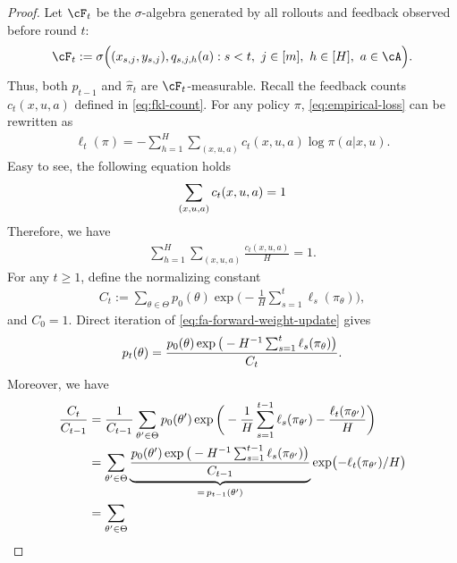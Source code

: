 \documentclass[11pt]{article}
\begin{document}
\begin{proof}
Let $\cF_t$ be the $\sigma$-algebra generated by all rollouts and
feedback observed before round $t$:
\begin{align*}
    \cF_t
    :=
    \sigma\Big(
        (x_{s,j},y_{s,j}),q_{s,j,h}(a):
        s<t,\ j\in[m],\ h\in[H],\ a\in\cA
    \Big).
\end{align*}
Thus, both $p_{t-1}$ and $\hat\pi_t$ are $\cF_t$-measurable. Recall the feedback counts
$c_t(x,u,a)$ defined in \eqref{eq:fkl-count}. For any policy $\pi$, \eqref{eq:empirical-loss} can be rewritten as
\begin{align}
    \ell_t(\pi)
    =
    -\sum_{h=1}^H
    \sum_{(x,u,a)}
    c_t(x,u,a)\log\pi(a|x,u).
    \label{eq:fa-proof-token-loss}
\end{align}
Easy to see, the following equation holds
\begin{align}
\notag
    \sum_{(x,u,a)}c_t(x,u,a)=1
\end{align}
Therefore, we have
\begin{align}  \sum_{h=1}^H\sum_{(x,u,a)}\frac{c_t(x,u,a)}{H}=1.
    \label{eq:fa-proof-feedback-mass}
\end{align}
For any $t\ge 1$, define the normalizing constant
\begin{align*}
     C_t
    :=
    \sum_{\theta\in\Theta}
    p_0(\theta)
    \exp\bigg(
        -\frac1H\sum_{s=1}^t\ell_s(\pi_\theta)
    \bigg),
\end{align*}
and $C_0 =1$. Direct iteration of \eqref{eq:fa-forward-weight-update} gives
\begin{align}
\notag
    p_t(\theta)
    =
    \frac{
        p_0(\theta)
        \exp\big(
            -H^{-1}\sum_{s=1}^t\ell_s(\pi_\theta)
        \big)
    }{
         C_t
    }.
\end{align}
Moreover, we have
\begin{align}
\notag
    \frac{C_t}{C_{t-1}}
    &=
    \frac1{C_{t-1}}
    \sum_{\theta'\in\Theta}
    p_0(\theta')
    \exp\bigg(
        -\frac1H\sum_{s=1}^{t-1}\ell_s(\pi_{\theta'})
        -
        \frac{\ell_t(\pi_{\theta'})}{H}
    \bigg)\\\notag
    &=
    \sum_{\theta'\in\Theta}
    \underbrace{
        \frac{
            p_0(\theta')
            \exp\big(
                -H^{-1}\sum_{s=1}^{t-1}\ell_s(\pi_{\theta'})
            \big)
        }{C_{t-1}}
    }_{=\,p_{t-1}(\theta')}
    \exp\bigl(-\ell_t(\pi_{\theta'})/H\bigr)\\\label{eq:normalize-ratio}
    &=
    \sum_{\theta'\in\Theta}

\end{align}
\end{proof}
\end{document}
